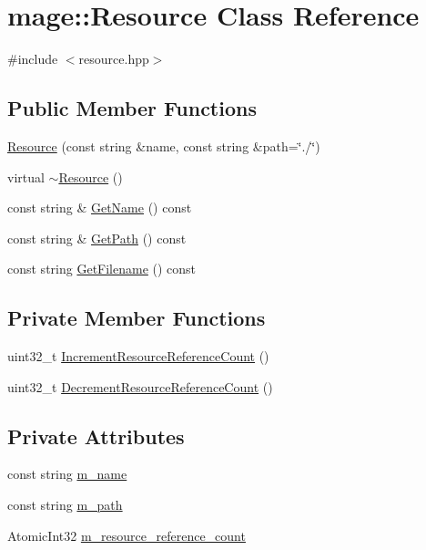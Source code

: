 \hypertarget{classmage_1_1_resource}{}\section{mage\+:\+:Resource Class Reference}
\label{classmage_1_1_resource}


{\ttfamily \#include $<$resource.\+hpp$>$}

\subsection*{Public Member Functions}
\begin{DoxyCompactItemize}
\item 
\hyperlink{classmage_1_1_resource_a7b4febc86646d51ac116732af01abcaf}{Resource} (const string \&name, const string \&path=\char`\"{}./\char`\"{})
\item 
virtual \hyperlink{classmage_1_1_resource_a80112db991a7dfd1dc0b24967981ac60}{$\sim$\+Resource} ()
\item 
const string \& \hyperlink{classmage_1_1_resource_a77713b0c74f8983afc2d42843afe8cbe}{Get\+Name} () const
\item 
const string \& \hyperlink{classmage_1_1_resource_a2ef6c6937947b56cbabc569e3a63ca71}{Get\+Path} () const
\item 
const string \hyperlink{classmage_1_1_resource_a3235bf2744390d5957b9b4038e4bb512}{Get\+Filename} () const
\end{DoxyCompactItemize}
\subsection*{Private Member Functions}
\begin{DoxyCompactItemize}
\item 
uint32\+\_\+t \hyperlink{classmage_1_1_resource_a0aee4b36717494677dbd6ba799f11ab4}{Increment\+Resource\+Reference\+Count} ()
\item 
uint32\+\_\+t \hyperlink{classmage_1_1_resource_a225b37285aa32d893a07d5b492ea99f9}{Decrement\+Resource\+Reference\+Count} ()
\end{DoxyCompactItemize}
\subsection*{Private Attributes}
\begin{DoxyCompactItemize}
\item 
const string \hyperlink{classmage_1_1_resource_a93019b74e9665195f1af17c60b6d171a}{m\+\_\+name}
\item 
const string \hyperlink{classmage_1_1_resource_a983470902250a8d16b6d5d01c332804b}{m\+\_\+path}
\item 
Atomic\+Int32 \hyperlink{classmage_1_1_resource_aa71f1ecac3436591032d2abd6a2f5c37}{m\+\_\+resource\+\_\+reference\+\_\+count}
\end{DoxyCompactItemize}
